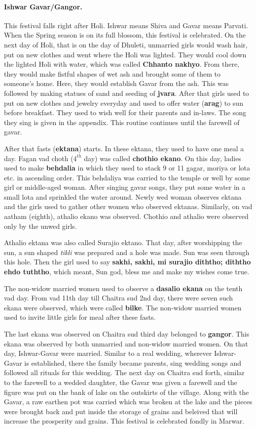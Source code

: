 \paragraph{Ishwar Gavar/Gangor.} This festival falls right after Holi. Ishwar
means Shiva and Gavar means Parvati. When the Spring season is on its full
blossom, this festival is celebrated. On the next day of Holi, that is on the
day of Dhuleti, unmarried girls would wash hair, put on new clothes and went
where the Holi was lighted. They would cool down the lighted Holi with water,
which was called \textbf{Chhanto nakhyo}. From there, they would make fistful
shapes of wet ash and brought some of them to someone's home. Here, they would establish
Gavar from the ash. This was followed by making statues of sand and seeding of
\textbf{jvara}.
After that girls used to put on new clothes and jewelry everyday and used to
offer water (\textbf{arag}) to sun before breakfast. They used to wish well for
their parents and in-laws. The song they sing is given in the appendix.
This routine continues until the farewell of gavar.

After that fasts (\textbf{ektana}) starts. In these ektana, they used to have
one meal a day. Fagan vad choth ($4^{th}$ day) was called \textbf{chothio ekano}. On this day, ladies
used to make \textbf{behdalia} in which they used to stack 9 or 11 gagar, moriya
or lota etc. in ascending order. This behdaliya was carried to the temple or
well by some girl or middle-aged woman. After singing gavar songs, they
put some water in a small lota and sprinkled the water around. Newly wed woman
observes ektana and the girls used to gather other women who observed
ektanas. Similarly, on vad aatham (eighth), athalio ekano was observed. Chothio
and athalio were observed only by the unwed girls.

Athalio ektana was also called Surajio ektano. That day, after worshipping the
sun, a sun shaped \textit{tikli} was prepared and a hole was made. Sun was seen
through this hole. Then the girl used to say \textbf{sakhi, sakhi, mi surajio
diththo; diththo ehdo tuththo}, which meant, Sun god, bless me and make my wishes
come true.

The non-widow married women used to observe a \textbf{dasalio ekana}
on the tenth vad day. From vad 11th day till Chaitra sud 2nd day, there were
seven such ekana were observed, which were called \textbf{bilke}. The non-widow
married women used to invite little girls for meal after these fasts.

The last ekana was observed on Chaitra sud third day belonged to
\textbf{gangor}. This ekana was observed by both unmarried and non-widow married
women. On that day, Ishwar-Gavar were married. Similar to a real wedding,
wherever Ishwar-Gavar is established, there the family became parents, sing
wedding songs and followed all rituals for this wedding. The next day on Chaitra
sud forth, similar to the farewell to a wedded daughter, the Gavar was given a
farewell and the figure was put on the bank of lake on the outskirts of the
village. Along with the Gavar, a raw earthen pot was carried which was broken at
the lake and the pieces were brought back and put inside the storage of grains
and beleived that will increase the prosperity and grains. This festival is
celebrated fondly in Marwar.

